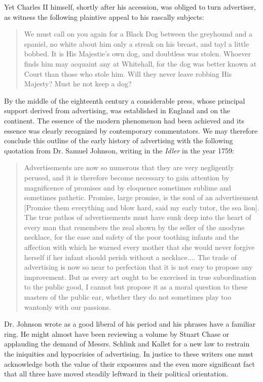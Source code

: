 \documentclass[twoside,nohyper,openany,nobib]{tufte-book}
\begin{document}
Yet Charles II himself, shortly after his accession, was obliged to turn
advertiser, as witness the following plaintive appeal to his rascally
subjects:

\begin{quote}
We must call on you again for a Black Dog between the greyhound and a
spaniel, no white about him only a streak on his breast, and tayl a
little bobbed. It is His Majestie's own dog, and doubtless was stolen.
Whoever finds him may acquaint any at Whitehall, for the dog was better
known at Court than those who stole him. Will they never leave robbing
His Majesty? Must he not keep a dog?
\end{quote}

By the middle of the eighteenth century a considerable press, whose
principal support derived from advertising, was established in England
and on the continent. The essence of the modern phenomenon had been
achieved and its essence was clearly recognized by contemporary
commentators. We may therefore conclude this outline of the early
history of advertising with the following quotation from Dr. Samuel
Johnson, writing in the \emph{Idler} in the year 1759:

\begin{quote}
Advertisements are now so numerous that they are very negligently
perused, and it is therefore become necessary to gain attention by
magnificence of promises and by eloquence sometimes sublime and
sometimes pathetic. Promise, large promise, is the soul of an
advertisement {[}Promise them everything and blow hard, said my early
tutor, the sea lion{]}. The true pathos of advertisements must have sunk
deep into the heart of every man that remembers the zeal shown by the
seller of the anodyne necklace, for the ease and safety of the poor
toothing infants and the affection with which he warned every mother
that she would never forgive herself if her infant should perish without
a necklace.... The trade of advertising is now so near to perfection
that it is not easy to propose any improvement. But as every art ought
to be exercised in true subordination to the public good, I cannot but
propose it as a moral question to these masters of the public ear,
whether they do not sometimes play too wantonly with our passions.
\end{quote}

Dr. Johnson wrote as a good liberal of his period and his phrases have a
familiar ring. He might almost have been reviewing a volume by Stuart
Chase or applauding the demand of Messrs. Schlink and Kallet for a new
law to restrain the iniquities and hypocrisies of advertising. In
justice to these writers one must acknowledge both the value of their
exposures and the even more significant fact that all three have moved
steadily leftward in their political orientation.
\end{document}
